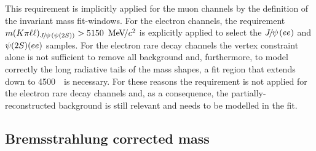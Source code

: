 This requirement is implicitly applied for the muon channels by the definition of the invariant mass fit-windows. For the electron channels,
the requirement $m(K\pi\ell\ell)_{\jpsi(\psitwos)} > 5150~\mevcc$ is explicitly applied to select the $\jpsi(ee)$ and $\psitwos(ee)$ samples.
For the electron rare decay channels the vertex constraint alone is not sufficient to remove all background and,
furthermore, to model correctly the long radiative tails of the mass shapes, a fit region that extends 
down to 4500~\mevcc~is necessary. For these reasons the requirement is not applied for the electron rare decay channels
and, as a consequence, the partially-reconstructed background is still relevant and needs to be modelled in the fit. %


%


\subsection{Bremsstrahlung corrected mass}
\label{sec:HOP}

